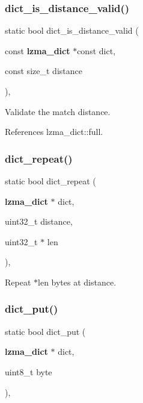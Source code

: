 \subsubsection{dict\+\_\+is\+\_\+distance\+\_\+valid()}
{\footnotesize\ttfamily static bool dict\+\_\+is\+\_\+distance\+\_\+valid (\begin{DoxyParamCaption}\item[{const \textbf{ lzma\+\_\+dict} $\ast$const}]{dict,  }\item[{const size\+\_\+t}]{distance }\end{DoxyParamCaption})\hspace{0.3cm}{\ttfamily [inline]}, {\ttfamily [static]}}



Validate the match distance. 



References lzma\+\_\+dict\+::full.

\mbox{\label{lz__decoder_8h_a36bee36b32a04403586112cffcb51ff2}} 
\subsubsection{dict\+\_\+repeat()}
{\footnotesize\ttfamily static bool dict\+\_\+repeat (\begin{DoxyParamCaption}\item[{\textbf{ lzma\+\_\+dict} $\ast$}]{dict,  }\item[{uint32\+\_\+t}]{distance,  }\item[{uint32\+\_\+t $\ast$}]{len }\end{DoxyParamCaption})\hspace{0.3cm}{\ttfamily [inline]}, {\ttfamily [static]}}



Repeat $\ast$len bytes at distance. 

\mbox{\label{lz__decoder_8h_a47402161f84a93481543e888ca65912d}} 
\subsubsection{dict\+\_\+put()}
{\footnotesize\ttfamily static bool dict\+\_\+put (\begin{DoxyParamCaption}\item[{\textbf{ lzma\+\_\+dict} $\ast$}]{dict,  }\item[{uint8\+\_\+t}]{byte }\end{DoxyParamCaption})\hspace{0.3cm}{\ttfamily [inline]}, {\ttfamily [static]}}

